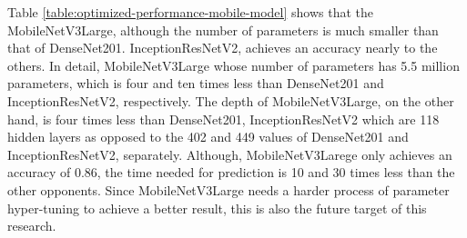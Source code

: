 \documentclass[sensors,article,accept,pdftex,moreauthors]{Definitions/mdpi}
\begin{document}
	Table \ref{table:optimized-performance-mobile-model} shows that the MobileNetV3Large, although the number of parameters is much smaller than that of DenseNet201. InceptionResNetV2, achieves an accuracy nearly to the others. In detail, MobileNetV3Large whose number of parameters has 5.5 million parameters, which is four and ten times less than DenseNet201 and InceptionResNetV2, respectively. The depth of MobileNetV3Large, on the other hand, is four times less than DenseNet201, InceptionResNetV2 which are 118 hidden layers as opposed to the 402 and 449 values of DenseNet201 and InceptionResNetV2, separately. Although, MobileNetV3Larege only achieves an accuracy of 0.86, the time needed for prediction is 10 and 30 times less than the other opponents. Since MobileNetV3Large needs a harder process of parameter hyper-tuning to achieve a better result, this is also the future target of this research.
	
\end{document}
